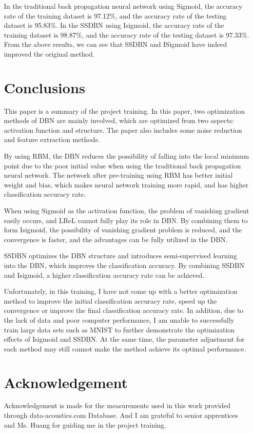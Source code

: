 \documentclass{bioinfo}
\begin{document}
In the traditional back propagation neural network using Sigmoid, the accuracy rate of the training dataset is 97.12\%, and the accuracy rate of the testing dataset is 95.83\%. In the SSDBN using Isigmoid, the accuracy rate of the training dataset is 98.87\%, and the accuracy rate of the testing dataset is 97.33\%. From the above results, we can see that SSDBN and ISigmoid have indeed improved the original method. 

\section{Conclusions}
This paper is a summary of the project training. In this paper, two optimization methods of DBN are mainly involved, which are optimized from two aspects: activation function and structure. The paper also includes some noise reduction and feature extraction methods.

By using RBM, the DBN reduces the possibility of falling into the local minimum point due to the poor initial value when using the traditional back propagation neural network. The network after pre-training using RBM has better initial weight and bias, which makes neural network training more rapid, and has higher classification accuracy rate.

When using Sigmoid as the activation function, the problem of vanishing gradient easily occurs, and LReL cannot fully play its role in DBN. By combining them to form Isigmoid, the possibility of vanishing gradient problem is reduced, and the convergence is faster, and the advantages can be fully utilized in the DBN.

SSDBN optimizes the DBN structure and introduces semi-supervised learning into the DBN, which improves the classification accuracy. By combining SSDBN and Isigmoid, a higher classification accuracy rate can be achieved.

Unfortunately, in this training, I have not come up with a better optimization method to improve the initial classification accuracy rate, speed up the convergence or improve the final classification accuracy rate. In addition, due to the lack of data and poor computer performance, I am unable to successfully train large data sets such as MNIST to further demonstrate the optimization effects of Isigmoid and SSDBN. At the same time, the parameter adjustment for each method may still cannot make the method achieve its optimal performance.


\section*{Acknowledgement}
Acknowledgement is made for the measurements used in this work provided through data-acoustics.com Database. And I am grateful to senior apprentices and Ms. Huang for guiding me in the project training.




 
\end{document}
